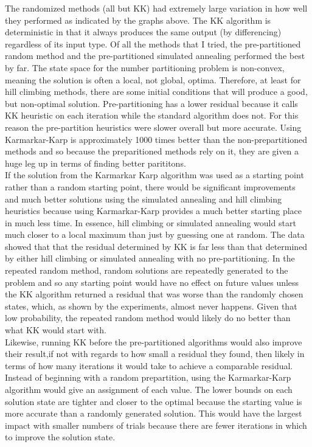 \documentclass[11pt]{article}
\begin{document}
The randomized methods (all but KK) had extremely large variation in how well they performed as indicated by the graphs above. The KK algorithm is deterministic in that it always produces the same output (by differencing) regardless of its input type. Of all the methods that I tried, the pre-partitioned random method and the pre-partitioned simulated annealing performed the best by far. The state space for the number partitioning problem is non-convex, meaning the solution is often a local, not global, optima. Therefore, at least for hill climbing methods, there are some initial conditions that will produce a good, but non-optimal solution. Pre-partitioning has a lower residual because it calls KK heuristic on each iteration while the standard algorithm does not. For this reason
the pre-partition heuristics were slower overall but more accurate. Using Karmarkar-Karp is approximately 1000 times better than the non-prepartitioned methods and so because the preparitioned methods rely on it, they are given a huge leg up in terms of finding better parititons. \\

If the solution from the Karmarkar Karp algorithm was used as a starting point rather than a random starting point, there would be significant improvements and much better solutions using the simulated annealing and hill climbing heuristics because using Karmarkar-Karp provides a much better starting place in much less time. In essence, hill climbing or simulated annealing would start much closer to a local maximum than just by guessing one at random. The data showed that that the residual determined by KK is far less than that determined by either hill climbing or simulated annealing with no pre-partitioning. In the repeated random method, random solutions are repeatedly generated to the problem and so any starting point would have no effect on future values unless the KK algorithm returned a residual that was worse than the randomly chosen states, which, as shown by the experiments, almost never happens. Given that low probability, the repeated random method would likely do no better than what KK would start with. \\

Likewise, running KK before the pre-partitioned algorithms would also improve their result,if not with regards to how small a residual they found, then likely in terms of how many iterations it would take to achieve a comparable residual. Instead of beginning with a random prepartition, using the Karmarkar-Karp algorithm would give an assignment of each value. The lower bounds on each solution state are tighter and closer to the optimal because the starting value is more accurate than a randomly generated solution. This would have the largest impact with smaller numbers of trials because there are fewer iterations in which to improve the solution state. \\
\end{document}
